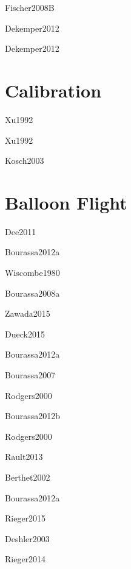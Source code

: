\documentclass[12pt]{article}
\begin{document}
Fischer2008B \citep{Fischer2008B}

Dekemper2012 \citep{Dekemper2012}

Dekemper2012 \citep{Dekemper2012}


\section{Calibration}

Xu1992 \citep{Xu1992}

Xu1992 \citep{Xu1992}

Kosch2003 \citep{Kosch2003}

\section{Balloon Flight}

Dee2011 \cite{Dee2011}

Bourassa2012a\citep{Bourassa2012a}

Wiscombe1980 \citep{Wiscombe1980}

Bourassa2008a \citep{Bourassa2008a}

Zawada2015 \citep{Zawada2015}

Dueck2015 \citep{Dueck2015}

Bourassa2012a\citep{Bourassa2012a}

Bourassa2007\citep{Bourassa2007}

Rodgers2000 \citep{Rodgers2000}

Bourassa2012b \citep{Bourassa2012b}

Rodgers2000 \citep{Rodgers2000}

Rault2013 \citep{Rault2013}

Berthet2002 \citep{Berthet2002}

Bourassa2012a \citep{Bourassa2012a}

Rieger2015 \citep{Rieger2015}

Deshler2003 \citep{Deshler2003}

Rieger2014 \citep{Rieger2014}





\end{document}
